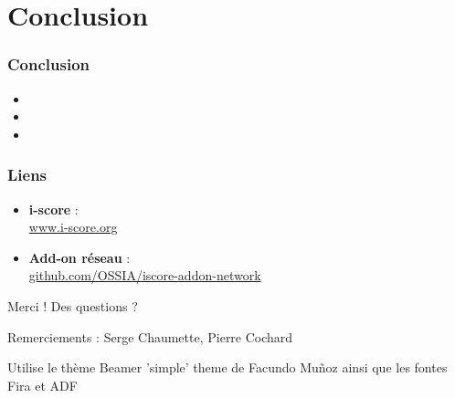 \documentclass[]{beamer}
\begin{document}
\section{Conclusion}
\begin{frame}
    \frametitle{Conclusion}  
    \Large
    \begin{itemize}
        \item<1> 
        \item<2> 
        \item<3> 
    \end{itemize}
\end{frame}

\begin{frame}[allowframebreaks]%
    
    
    
    {\footnotesize
        \nocite{*}
        
        
    }
\end{frame}

\begin{frame}
    \frametitle{Liens} 
    \Large
    \begin{itemize}
        \setlength\itemsep{1em}
        \item \textbf{i-score} :~\\ {\small \url{www.i-score.org} }
        \item \textbf{Add-on réseau} :~\\ {\small \url{github.com/OSSIA/iscore-addon-network} }
    \end{itemize}
        
    \centering
    \vspace{2em}
    \Large{Merci ! Des questions ?}
    \vspace{2em}
    
    \small{Remerciements : Serge Chaumette, Pierre Cochard}
    
    \vspace{1em}
    
    \tiny{Utilise le thème Beamer 'simple' theme de Facundo Muñoz ainsi que les fontes Fira et ADF}
\end{frame}
\end{document}
